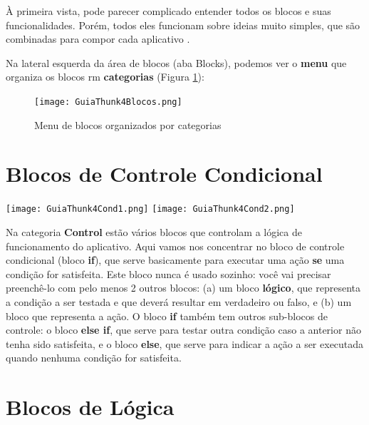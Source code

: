 \documentclass[11pt,fleqn]{book} %
\begin{document}
À primeira vista, pode parecer complicado entender todos os blocos e suas funcionalidades. Porém, todos eles funcionam sobre ideias muito simples, que são combinadas para compor cada aplicativo .

Na lateral esquerda da área de blocos (aba Blocks), podemos ver o \textbf{menu} que organiza os blocos rm \textbf{categorias} (Figura \ref{fig:menublocos}):

\begin{figure}[H]
	\centering
	\texttt{[image: GuiaThunk4Blocos.png]}
    \caption{Menu de blocos organizados por categorias}\label{fig:menublocos}	
\end{figure}


\section{Blocos de Controle Condicional}

\begin{minipage}{0.35\textwidth}
	\texttt{[image: GuiaThunk4Cond1.png]}
	\texttt{[image: GuiaThunk4Cond2.png]}
\end{minipage}
\hfill
\begin{minipage}{0.6\textwidth}\raggedright
	Na categoria \textbf{Control} estão vários blocos que controlam a lógica de funcionamento do aplicativo. Aqui vamos nos concentrar no bloco de controle condicional (bloco \textbf{if}), que serve basicamente para executar uma ação \textbf{se} uma condição for satisfeita. Este bloco nunca é usado sozinho: você vai precisar preenchê-lo com pelo menos 2 outros blocos: (a) um bloco \textbf{lógico}, que representa a condição a ser testada e que deverá resultar em verdadeiro ou falso, e (b) um bloco que representa a ação. O bloco \textbf{if} também tem outros sub-blocos de controle: o bloco \textbf{else if}, que serve para testar outra condição caso a anterior não tenha sido satisfeita, e o bloco \textbf{else}, que serve para indicar a ação a ser executada quando nenhuma condição for satisfeita.
	
\end{minipage}


\section{Blocos de Lógica}
\end{document}
